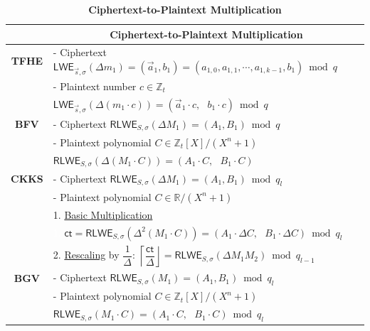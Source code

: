 \begin{table}[h]
\begin{tabular}{|c||l|}
\hline
&\multicolumn{1}{c|}{\textbf{Ciphertext-to-Plaintext Multiplication}}\\\hline\hline
\textbf{TFHE}&- Ciphertext $\textsf{LWE}_{\vec{s}, \sigma}(\Delta m_1) = (\vec{a}_1, b_1) = (a_{1,0}, a_{1, 1}, \cdots, a_{1, k-1}, b_1) \bmod q$\\
&- Plaintext number $c \in \mathbb{Z}_t$\\
&$\textsf{LWE}_{\vec{s}, \sigma}(\Delta (m_1 \cdot c)) = (\vec{a}_1 \cdot c, \text{ } b_1 \cdot c) \bmod q$\\\hline
\textbf{BFV}&- Ciphertext $\textsf{RLWE}_{S, \sigma}(\Delta M_1) = (A_1, B_1) \bmod q$\\
&- Plaintext polynomial $C \in \mathbb{Z}_t[X]/(X^n + 1)$\\
&$\textsf{RLWE}_{S, \sigma}(\Delta (M_1 \cdot C)) =(A_1 \cdot C, \text{ } B_1 \cdot C)$\\\hline
\textbf{CKKS}&- Ciphertext $\textsf{RLWE}_{S, \sigma}(\Delta M_1) = (A_1, B_1)  \bmod q_l$\\
&- Plaintext polynomial $C \in \mathbb{R}/(X^n + 1)$\\
&1. \underline{Basic Multiplication}\\
&\textcolor{white}{1. } $\textsf{ct} = \textsf{RLWE}_{S, \sigma}(\Delta^2 (M_1 \cdot C)) =(A_1 \cdot \Delta C, \text{ } B_1 \cdot \Delta  C)  \bmod q_l$\\
&2. \underline{Rescaling} by $\dfrac{1}{\Delta}$: $\left\lceil\dfrac{\textsf{ct}}{\Delta}\right\rfloor = \textsf{RLWE}_{S, \sigma}(\Delta M_1 M_2) \bmod q_{l-1}$\\\hline
\textbf{BGV}&- Ciphertext $\textsf{RLWE}_{S, \sigma}(M_1) = (A_1, B_1) \bmod q_l$\\
&- Plaintext polynomial $C \in \mathbb{Z}_t[X]/(X^n + 1)$\\
&$\textsf{RLWE}_{S, \sigma}(M_1 \cdot C) =(A_1 \cdot C, \text{ } B_1\cdot C)  \bmod q_l$\\\hline
\end{tabular}
\caption{\textbf{Ciphertext-to-Plaintext Multiplication}}
\end{table}




